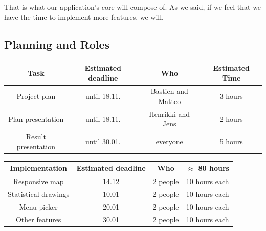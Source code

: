 \documentclass[12pt]{article}
\begin{document}
        \noindent That is what our application's core will compose of. As we said, if we feel
        that we have the time to implement more features, we will.

        \newpage

        {\color{color_subsection}\subsection{Planning and Roles}}
        \vspace{1em}
           
	\begin{center}
	    \begin{tabular}{ |c|c|c|c| } 
 	        \hline
	        \textbf{Task} & \textbf{Estimated deadline} & \textbf{Who} & \textbf{Estimated Time}  \\
	        \hline
 	        Project plan & until 18.11. & Bastien and Matteo & 3 hours \\ 
 	        \hline
 	        Plan presentation & until 18.11. & Henrikki and Jens & 2 hours \\
            \hline 
            Result presentation & until 30.01. & everyone & 5 hours \\ 
            \hline 
        \end{tabular}
    \end{center}
    
    \begin{center}
        \begin{tabular}{ |c|c|c|c| } 
            \hline
            \textbf{Implementation} & \textbf{Estimated deadline} & \textbf{Who} & \textbf{$\approx$ 80 hours} \\
            \hline
            Responsive map & 14.12 & 2 people & 10 hours each \\
            \hline
 	        Statistical drawings & 10.01 & 2 people & 10 hours each\\  
            \hline
            Menu picker & 20.01 & 2 people & 10 hours each \\
            \hline
            Other features & 30.01 & 2 people & 10 hours each \\
	        \hline
	    \end{tabular}
    \end{center}
    
\end{document}
